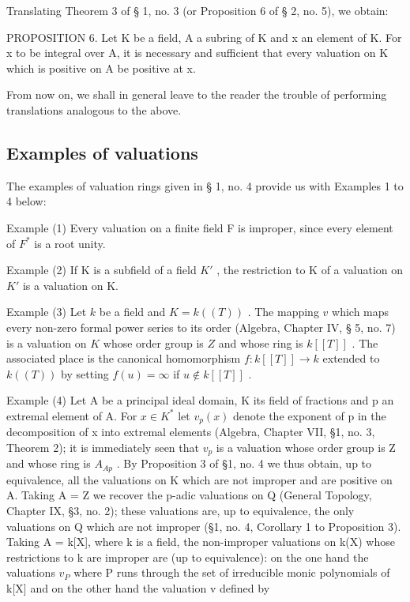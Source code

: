 Translating Theorem 3 of § 1, no. 3 (or Proposition 6 of § 2, no. 5), we obtain:

PROPOSITION 6. Let K be a field, A a subring of K and x an element of K. For x to be integral over A, it is necessary and sufficient that every valuation on K which is positive on A be positive at x.

From now on, we shall in general leave to the reader the trouble of performing translations analogous to the above.

\subsection{Examples of valuations}

The examples of valuation rings given in § 1, no. 4 provide us with Examples 1 to 4 below:

Example (1) Every valuation on a finite field F is improper, since every element of \(F^{*}\) is a root unity.

Example (2) If K is a subfield of a field \(K'\) , the restriction to K of a valuation on \(K'\) is a valuation on K.

Example (3) Let \(k\) be a field and \(K = k((T))\) . The mapping \(v\) which maps every non-zero formal power series to its order (Algebra, Chapter IV, § 5, no. 7) is a valuation on \(K\) whose order group is \(Z\) and whose ring is \(k[[T]]\) . The associated place is the canonical homomorphism \(f: k[[T]] \to k\) extended to \(k((T))\) by setting \(f(u) = \infty\) if \(u \notin k[[T]]\) .

Example (4) Let A be a principal ideal domain, K its field of fractions and p an extremal element of A. For \(x \in K^{*}\) let \(v_{p}(x)\) denote the exponent of p in the decomposition of x into extremal elements (Algebra, Chapter VII, §1, no. 3, Theorem 2); it is immediately seen that \(v_{p}\) is a valuation whose order group is Z and whose ring is \(A_{Ap}\) . By Proposition 3 of §1, no. 4 we thus obtain, up to equivalence, all the valuations on K which are not improper and are positive on A. Taking A = Z we recover the p-adic valuations on Q (General Topology, Chapter IX, §3, no. 2); these valuations are, up to equivalence, the only valuations on Q which are not improper (§1, no. 4, Corollary 1 to Proposition 3). Taking A = k{[}X{]}, where k is a field, the non-improper valuations on k(X) whose restrictions to k are improper are (up to equivalence): on the one hand the valuations \(v_{P}\) where P runs through the set of irreducible monic polynomials of k{[}X{]} and on the other hand the valuation v defined by

